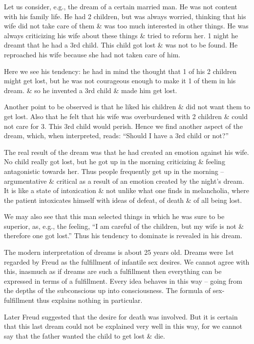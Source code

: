\documentclass{article}
\numberwithin{equation}{section}
\begin{document}
Let us consider, e.g., the dream of a certain married man. He was not content with his family life. He had 2 children, but was always worried, thinking that his wife did not take care of them \& was too much interested in other things. He was always criticizing his wife about these things \& tried to reform her. 1 night he dreamt that he had a 3rd child. This child got lost \& was not to be found. He reproached his wife because she had not taken care of him.

Here we see his tendency: he had in mind the thought that 1 of his 2 children might get lost, but he was not courageous enough to make it 1 of them in his dream. \& so he invented a 3rd child \& made him get lost.

Another point to be observed is that he liked his children \& did not want them to get lost. Also that he felt that his wife was overburdened with 2 children \& could not care for 3. This 3rd child would perish. Hence we find another aspect of the dream, which, when interpreted, reads: ``Should I have a 3rd child or not?''

The real result of the dream was that he had created an emotion against his wife. No child really got lost, but he got up in the morning criticizing \& feeling antagonistic towards her. Thus people frequently get up in the morning -- argumentative \& critical as a result of an emotion created by the night's dream. It is like a state of intoxication \& not unlike what one finds in melancholia, where the patient intoxicates himself with ideas of defeat, of death \& of all being lost.

We may also see that this man selected things in which he was sure to be superior, as, e.g., the feeling, ``I am careful of the children, but my wife is not \& therefore one got lost.'' Thus his tendency to dominate is revealed in his dream.

The modern interpretation of dreams is about 25 years old. Dreams were 1st regarded by Freud as the fulfillment of infantile sex desires. We cannot agree with this, inasmuch as if dreams are such a fulfillment then everything can be expressed in terms of a fulfillment. Every idea behaves in this way -- going from the depths of the subconscious up into consciousness. The formula of sex-fulfillment thus explains nothing in particular.

Later Freud suggested that the desire for death was involved. But it is certain that this last dream could not be explained very well in this way, for we cannot say that the father wanted the child to get lost \& die.
\end{document}
